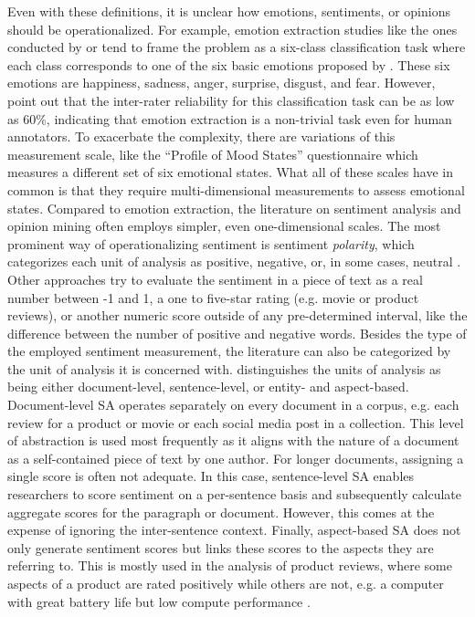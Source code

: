 Even with these definitions, it is unclear how emotions, sentiments, or opinions should be operationalized. For example, emotion extraction studies like the ones conducted by  or  tend to frame the problem as a six-class classification task where each class corresponds to one of the six basic emotions proposed by . These six emotions are happiness, sadness, anger, surprise, disgust, and fear. However,  point out that the inter-rater reliability for this classification task can be as low as 60\%, indicating that emotion extraction is a non-trivial task even for human annotators. To exacerbate the complexity, there are variations of this measurement scale, like the ``Profile of Mood States'' questionnaire  which measures a different set of six emotional states. What all of these scales have in common is that they require multi-dimensional measurements to assess emotional states. \newline
Compared to emotion extraction, the literature on sentiment analysis and opinion mining often employs simpler, even one-dimensional scales. The most prominent way of operationalizing sentiment is sentiment \emph{polarity}, which categorizes each unit of analysis as positive, negative, or, in some cases, neutral \cite{ravi2015survey}. Other approaches try to evaluate the sentiment in a piece of text as a real number between -1 and 1, a one to five-star rating (e.g. movie or product reviews), or another numeric score outside of any pre-determined interval, like the difference between the number of positive and negative words.\newline
Besides the type of the employed sentiment measurement, the literature can also be categorized by the unit of analysis it is concerned with.  distinguishes the units of analysis as being either document-level, sentence-level, or entity- and aspect-based. Document-level SA operates separately on every document in a corpus, e.g. each review for a product or movie or each social media post in a collection. This level of abstraction is used most frequently as it aligns with the nature of a document as a self-contained piece of text by one author. For longer documents, assigning a single score is often not adequate. In this case, sentence-level SA enables researchers to score sentiment on a per-sentence basis and subsequently calculate aggregate scores for the paragraph or document. However, this comes at the expense of ignoring the inter-sentence context. Finally, aspect-based SA does not only generate sentiment scores but links these scores to the aspects they are referring to. This is mostly used in the analysis of product reviews, where some aspects of a product are rated positively while others are not, e.g. a computer with great battery life but low compute performance .

